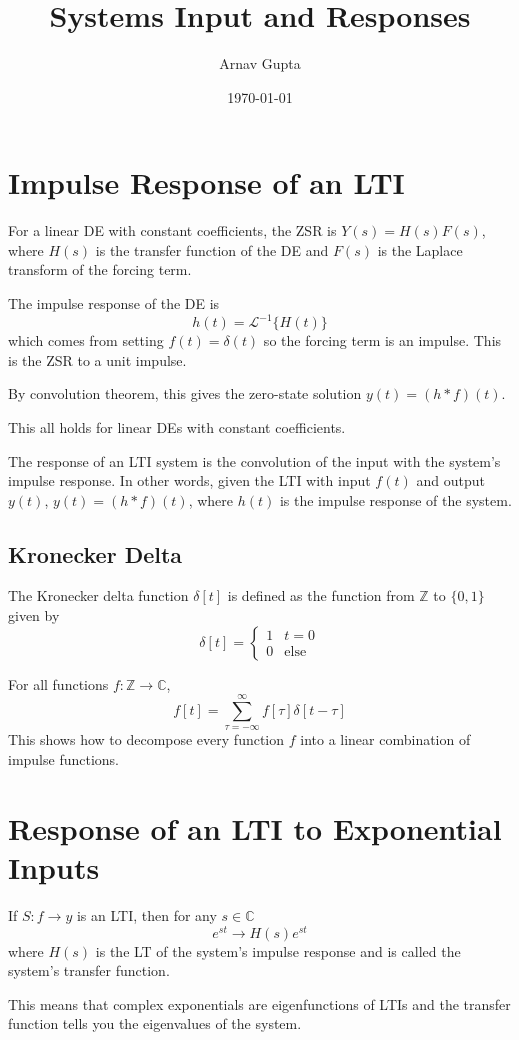 \documentclass[11pt]{article}
\author{Arnav Gupta}
\date{\today}
\title{Systems Input and Responses}
\begin{document}
\maketitle
\tableofcontents

\section{Impulse Response of an LTI}
\label{sec:org64a4ca0}
For a linear DE with constant coefficients, the ZSR is \(Y(s) = H(s) F(s)\),
where \(H(s)\) is the transfer function of the DE and \(F(s)\) is the Laplace transform of the
forcing term.

The impulse response of the DE is
$$
h(t) = \mathscr{L}^{-1} \{ H(t) \}
$$
which comes from setting \(f(t) = \delta (t)\) so the forcing term is an impulse.
This is the ZSR to a unit impulse.

By convolution theorem, this gives the zero-state solution \(y(t) = (h * f)(t)\).

This all holds for linear DEs with constant coefficients.

The response of an LTI system is the convolution of the input with the system's impulse
response.
In other words, given the LTI with input \(f(t)\) and output \(y(t)\),
\(y(t) = (h * f)(t)\), where \(h(t)\) is the impulse response of the system.
\subsection{Kronecker Delta}
\label{sec:orgde536c0}
The Kronecker delta function \(\delta [t]\) is defined as the function from \(\mathbb{Z}\) to
\(\{0, 1\}\) given by
$$
\delta [t] = \begin{cases}
1 & t = 0 \\
0 & \text{else}
\end{cases}
$$

For all functions \(f : \mathbb{Z} \to \mathbb{C}\),
$$
f[t] = \sum_{\tau = -\infty}^{\infty} f [\tau] \delta[t - \tau]
$$
This shows how to decompose every function \(f\) into a linear combination of impulse functions.
\section{Response of an LTI to Exponential Inputs}
\label{sec:orgf8cfd85}
If \(S: f \to y\) is an LTI, then for any \(s \in \mathbb{C}\)
$$
e^{st} \to H(s) e^{st}
$$
where \(H(s)\) is the LT of the system's impulse response and is called the system's transfer
function.

This means that complex exponentials are eigenfunctions of LTIs and the transfer function tells
you the eigenvalues of the system.
\end{document}
